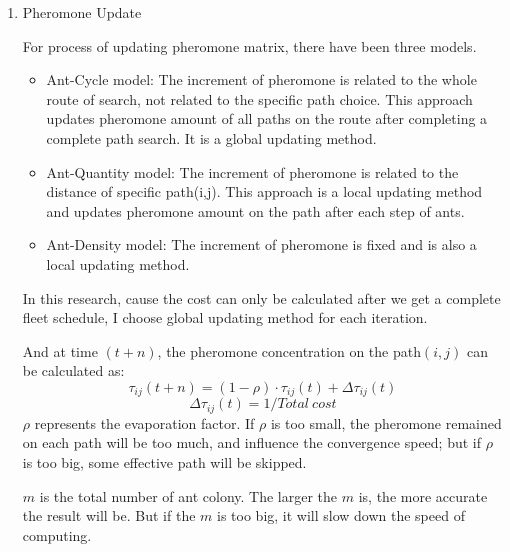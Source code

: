 \documentclass[senior]{IPSstyle}
\begin{document}
\begin{enumerate}
    \item Pheromone Update
    
    For process of updating pheromone matrix, there have been three models.
    \begin{itemize}
        \item Ant-Cycle model:  The increment of pheromone is related to the whole route of search, not related to the specific path choice. This approach updates pheromone amount of all paths on the route after completing a complete path search. It is a global updating method.
        \item Ant-Quantity model: The increment of pheromone is related to the distance of specific path(i,j). This approach is a local updating method and updates pheromone amount on the path after each step of ants.
        \item Ant-Density model: The increment of pheromone is fixed and is also a local updating method.
    \end{itemize}
    In this research, cause the cost can only be calculated after we get a complete fleet schedule, I choose global updating method for each iteration.
    
    And at time \((t+n)\), the pheromone concentration on the path\((i,j)\) can be calculated as:
    \begin{equation}
        \tau _{ij}(t+n)=(1-\rho)\cdot \tau _{ij}(t)+\Delta\tau _{ij}(t)
    \end{equation}
    \begin{equation}
        \Delta\tau _{ij}(t) = 1/Total\ cost
    \end{equation}
    \(\rho\) represents the evaporation factor. If \(\rho\) is too small, the pheromone remained on each path will be too much, and influence the convergence speed; but if \(\rho\) is too big, some effective path will be skipped. 
    
    \(m\) is the total number of ant colony. The larger the \(m\) is, the  more accurate the result will be. But if the \(m\) is too big, it will slow down the speed of computing.
\end{enumerate}

 
\end{document}
